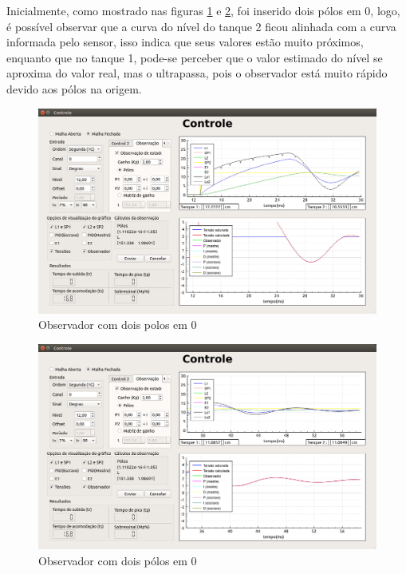 \documentclass[a4paper,12pt]{article}
\begin{document}
\hspace{4ex}Inicialmente, como mostrado nas figuras \ref{img1} e \ref{img2}, foi inserido dois pólos em 0, logo, é possível observar que a curva do nível do tanque 2 ficou alinhada com a curva informada pelo sensor, isso indica que seus valores estão muito próximos, enquanto que no tanque 1, pode-se perceber que o valor estimado do nível se aproxima do valor real, mas o ultrapassa, pois  o observador está muito rápido devido aos pólos na origem.
\begin{figure}[!h]
\centering
\includegraphics[width=13cm]{FotosObservador/PolosEm01}
\caption{Observador com dois polos em 0}
\label{img1}
\end{figure}
\begin{figure}[!h]
\centering
\includegraphics[width=13cm]{FotosObservador/PolosEm02}
\caption{Observador com dois pólos em 0}
\label{img2}
\end{figure}
\end{document}
